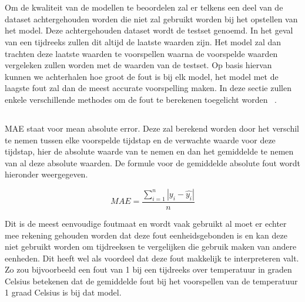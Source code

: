 \section{}

Om de kwaliteit van de modellen te beoordelen zal er telkens een deel van de dataset achtergehouden worden die niet zal gebruikt worden bij het opstellen van het model. Deze achtergehouden dataset wordt de testset genoemd. In het geval van een tijdreeks zullen dit altijd de laatste waarden zijn. Het model zal dan trachten deze laatste waarden te voorspellen waarna de voorspelde waarden vergeleken zullen worden met de waarden van de testset. Op basis hiervan kunnen we achterhalen hoe groot de fout is bij elk model, het model met de laagste fout zal dan de meest accurate voorspelling maken. 
In deze sectie zullen enkele verschillende methodes om de fout te berekenen toegelicht worden ~\autocite{Hyndman2018}.

\subsection{}

\subsubsection{}
MAE staat voor mean absolute error. Deze zal berekend worden door het verschil te nemen tussen elke voorspelde tijdstap en de verwachte waarde voor deze tijdstap, hier de absolute waarde van te nemen en dan het gemiddelde te nemen van al deze absolute waarden. De formule voor de gemiddelde absolute fout wordt hieronder weergegeven.

\begin{equation}
MAE = \frac{\sum_{i=1}^{n} |y_i - \hat{y_i}|}{n}
\end{equation}

Dit is de meest eenvoudige foutmaat en wordt vaak gebruikt al moet er echter mee rekening gehouden worden dat deze fout eenheidsgebonden is en kan deze niet gebruikt worden om tijdreeksen te vergelijken die gebruik maken van andere eenheden. Dit heeft wel als voordeel dat deze fout makkelijk te interpreteren valt. Zo zou bijvoorbeeld een fout van 1 bij een tijdreeks over temperatuur in graden Celsius betekenen dat de gemiddelde fout bij het voorspellen van de temperatuur 1 graad Celsius is bij dat model.

\subsubsection{}


